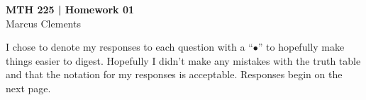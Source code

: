\documentclass{article}
\begin{document}
\begin{center}
      \textbf{MTH 225 | Homework 01} \\
      Marcus Clements
\end{center}

I chose to denote my responses to each question with a ``$\bullet$'' to hopefully make things easier to digest. Hopefully I didn't make any mistakes with the truth table and that the notation for my responses is acceptable. Responses begin on the next page.\newline


\end{document}

